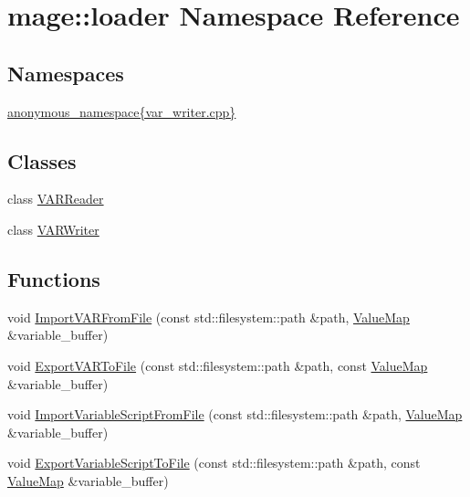 \hypertarget{namespacemage_1_1loader}{}\section{mage\+:\+:loader Namespace Reference}
\label{namespacemage_1_1loader}
\subsection*{Namespaces}
\begin{DoxyCompactItemize}
\item 
 \mbox{\hyperlink{namespacemage_1_1loader_1_1anonymous__namespace_02var__writer_8cpp_03}{anonymous\+\_\+namespace\{var\+\_\+writer.\+cpp\}}}
\end{DoxyCompactItemize}
\subsection*{Classes}
\begin{DoxyCompactItemize}
\item 
class \mbox{\hyperlink{classmage_1_1loader_1_1_v_a_r_reader}{V\+A\+R\+Reader}}
\item 
class \mbox{\hyperlink{classmage_1_1loader_1_1_v_a_r_writer}{V\+A\+R\+Writer}}
\end{DoxyCompactItemize}
\subsection*{Functions}
\begin{DoxyCompactItemize}
\item 
void \mbox{\hyperlink{namespacemage_1_1loader_a4b7a47e1545c2c4c337309ddf0b8222e}{Import\+V\+A\+R\+From\+File}} (const std\+::filesystem\+::path \&path, \mbox{\hyperlink{namespacemage_a3a4b59e486babe3ec78455f9ee0d4beb}{Value\+Map}} \&variable\+\_\+buffer)
\item 
void \mbox{\hyperlink{namespacemage_1_1loader_a7e14ec01f869a19cf62e0f927697c294}{Export\+V\+A\+R\+To\+File}} (const std\+::filesystem\+::path \&path, const \mbox{\hyperlink{namespacemage_a3a4b59e486babe3ec78455f9ee0d4beb}{Value\+Map}} \&variable\+\_\+buffer)
\item 
void \mbox{\hyperlink{namespacemage_1_1loader_acc5bf883cc0640530b181485c1d74017}{Import\+Variable\+Script\+From\+File}} (const std\+::filesystem\+::path \&path, \mbox{\hyperlink{namespacemage_a3a4b59e486babe3ec78455f9ee0d4beb}{Value\+Map}} \&variable\+\_\+buffer)
\item 
void \mbox{\hyperlink{namespacemage_1_1loader_a553aa867cbdb56515314443d1047d4bf}{Export\+Variable\+Script\+To\+File}} (const std\+::filesystem\+::path \&path, const \mbox{\hyperlink{namespacemage_a3a4b59e486babe3ec78455f9ee0d4beb}{Value\+Map}} \&variable\+\_\+buffer)
\end{DoxyCompactItemize}
